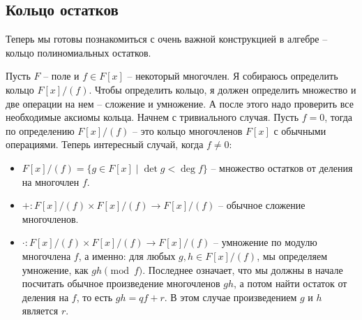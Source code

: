 \subsection{Кольцо остатков}
\label{section::PolyRems}

Теперь мы готовы познакомиться с очень важной конструкцией в алгебре -- кольцо полиномиальных остатков.

Пусть $F$ -- поле и $f\in F[x]$ -- некоторый многочлен.
Я собираюсь определить кольцо $F[x]/(f)$.
Чтобы определить кольцо, я должен определить множество и две операции на нем -- сложение и умножение.
А после этого надо проверить все необходимые аксиомы кольца.
Начнем с тривиального случая.
Пусть $f = 0$, тогда по определению $F[x]/(f)$ -- это кольцо многочленов $F[x]$ с обычными операциями.
Теперь интересный случай, когда $f \neq 0$:
\begin{itemize}
\item $F[x]/(f) = \{g \in F[x]\mid \det g < \deg f\}$ -- множество остатков от деления на многочлен $f$.

\item $+\colon F[x]/(f)\times F[x]/(f) \to F[x]/(f)$ -- обычное сложение многочленов.

\item $\cdot \colon F[x]/(f)\times F[x]/(f) \to F[x]/(f)$ -- умножение по модулю многочлена $f$, а именно: для любых $g, h\in F[x]/(f)$, мы определяем умножение, как  $gh \pmod{f}$.
Последнее означает, что мы должны в начале посчитать обычное произведение многочленов $gh$, а потом найти остаток от деления на $f$, то есть $gh = q f + r$.
В этом случае произведением $g$ и  $h$ является $r$.
\end{itemize}

